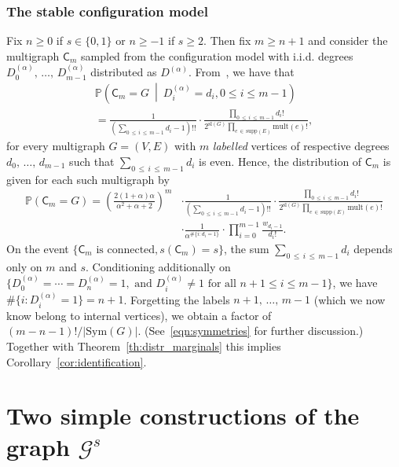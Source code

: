 \documentclass[AHL,Unicode,longabstracts,published]{cedram}
\newcommand{\supp}{\mathrm{supp}}
\newcommand{\sll}{\mathrm{sl}}
\newcommand{\Sym}{\mathrm{Sym}}
\newcommand{\mult}{\mathrm{mult}}
\newcommand{\cG}{\mathcal{G}}
\newcommand{\sC}{\mathsf{C}}
\newcommand{\bbP}{\mathbb{P}}
\begin{document}
\subsubsection{The stable configuration model}
Fix $n \geq 0$ if $s\in \{0,1\}$ or $n \geq -1$ if $s \geq 2$. Then fix $m \ge n+1$ and consider the multigraph $\sC_{m}$ sampled from the configuration model with i.i.d. degrees $D^{(\alpha)}_0,\,\ldots,\,D^{(\alpha)}_{m-1}$ distributed as $D^{(\alpha)}$. From~\cite[Proposition~7.7]{RvdH}, we have that
\begin{multline*}
\bbP\left(\sC_{m} = G \ \middle| \ D^{(\alpha)}_i=d_i, 0 \leq i \leq m-1\right)\\
=\frac{1}{\left(\sum\limits_{0\,\leq\,i\,\leq\,m-1} d_i-1\right)!!}\cdot\frac{\prod\limits_{0\,\leq\,i\,\leq\, m-1} d_i!}{2^{\sll(G)}\prod\limits_{e\,\in\,\supp(E)}\mult(e)!},
\end{multline*}
for every multigraph $G=(V,E)$ with $m$ \emph{labelled} vertices of respective degrees $d_0,\,\ldots,\,d_{m-1}$ such that $\sum_{0\,\leq\,i\,\leq\,m-1} d_i$ is even. Hence, the distribution of $\sC_{m}$ is given for each such multigraph by
\begin{align*}
\bbP\left(\sC_{m}=G\right)= \left(\frac{2(1+\alpha)\alpha}{\alpha^2+\alpha+2}\right)^m &\cdot \frac{1}{\left(\sum\limits_{0\,\leq\,i\,\leq\,m-1} d_i-1\right)!!}\cdot\frac{\prod\limits_{0\,\leq\,i\,\leq\,m-1} d_i!}{2^{\sll(G)}\prod\limits_{e\,\in\,\supp(E)}\mult(e)!} \\
&\cdot\frac{1}{\alpha^{\#\{i:d_i=1\}}}\cdot \prod_{i=0}^{m-1}\frac{w_{d_i-1}}{d_i!}.
\end{align*}
On the event $\{\sC_m \text{ is connected}, s(\sC_m) = s\}$, the sum $\sum_{0\,\leq\,i\,\leq\,m-1} d_i$ depends only on $m$ and $s$. Conditioning additionally on $\{D^{(\alpha)}_0 = \cdots = D^{(\alpha)}_{n} = 1, \text{ and } D^{(\alpha)}_i \neq 1 \text{ for all } n+1 \le i \le m-1\}$, we have $\#\{i:D^{(\alpha)}_i=1\} = n+1$. Forgetting the labels $n+1,\,\ldots,\,m-1$ (which we now know belong to internal vertices), we obtain a factor of $(m-n-1)!/|\Sym(G)|$. (See~\eqref{eqn:symmetries} for further discussion.) Together with Theorem~\ref{th:distr_marginals} this implies Corollary~\ref{cor:identification}.


\section{Two simple constructions of the graph \texorpdfstring{$\cG^s$}{Gs}}\label{sec:final}
\end{document}
